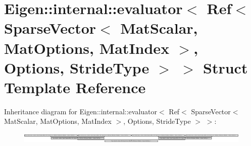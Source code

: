 \hypertarget{struct_eigen_1_1internal_1_1evaluator_3_01_ref_3_01_sparse_vector_3_01_mat_scalar_00_01_mat_optic924bcdf873ee6e467b0642118d17ceb}{}\section{Eigen\+:\+:internal\+:\+:evaluator$<$ Ref$<$ Sparse\+Vector$<$ Mat\+Scalar, Mat\+Options, Mat\+Index $>$, Options, Stride\+Type $>$ $>$ Struct Template Reference}
\label{struct_eigen_1_1internal_1_1evaluator_3_01_ref_3_01_sparse_vector_3_01_mat_scalar_00_01_mat_optic924bcdf873ee6e467b0642118d17ceb}
Inheritance diagram for Eigen\+:\+:internal\+:\+:evaluator$<$ Ref$<$ Sparse\+Vector$<$ Mat\+Scalar, Mat\+Options, Mat\+Index $>$, Options, Stride\+Type $>$ $>$\+:\begin{figure}[H]
\begin{center}
\leavevmode
\includegraphics[height=0.498221cm]{struct_eigen_1_1internal_1_1evaluator_3_01_ref_3_01_sparse_vector_3_01_mat_scalar_00_01_mat_optic924bcdf873ee6e467b0642118d17ceb}
\end{center}
\end{figure}
